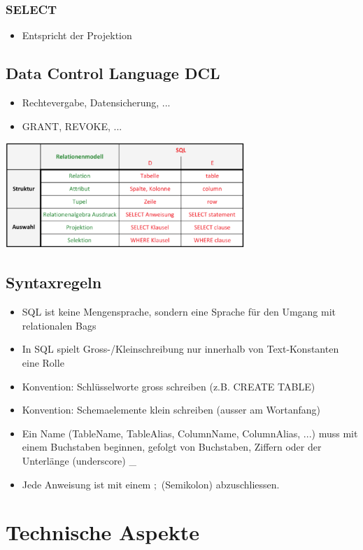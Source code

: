 \documentclass[8pt,a4paper]{scrartcl}
\begin{document}
\begin{multicols*}{3}
				\subsubsection{SELECT}
					\begin{itemize}\itemsep0pt		
						\item Entspricht der Projektion
					\end{itemize}	
			
			\subsection{Data Control Language DCL}
				\begin{itemize}\itemsep0pt		
					\item Rechtevergabe, Datensicherung, ...
					\item GRANT, REVOKE, ...
				\end{itemize}		
				
			\includegraphics[height=4cm]{img/sql1.png}
			
			\subsection{Syntaxregeln}
				\begin{itemize}\itemsep0pt		
					\item SQL ist keine Mengensprache, sondern eine Sprache für den Umgang mit relationalen Bags
					\item In SQL spielt Gross-/Kleinschreibung nur innerhalb von Text-Konstanten eine Rolle
					\item Konvention: Schlüsselworte gross schreiben (z.B. CREATE TABLE)
					\item Konvention: Schemaelemente klein schreiben (ausser am Wortanfang)
					\item Ein Name (TableName, TableAlias, ColumnName, ColumnAlias, ...) muss mit einem Buchstaben beginnen, gefolgt von Buchstaben, Ziffern oder der Unterlänge (underscore) \_
					\item Jede Anweisung ist mit einem $;$ (Semikolon) abzuschliessen.
				\end{itemize}	
			
			
			
				
				
				
				
				
				
				
				
		
		\section{Technische Aspekte}
		
	\end{multicols*}
\end{document}
